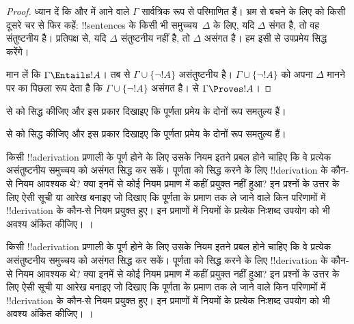 \documentclass[../../../include/open-logic-section]{subfiles}
\begin{document}
\begin{proof}
ध्यान दें कि  और  में आने
वाले $\Gamma$ सार्वत्रिक रूप से परिमाणित हैं। भ्रम से बचने के लिए
 को किसी दूसरे चर से फिर कहें: !!{sentence}s के किसी
भी समुच्चय~$\Delta$ के लिए, यदि $\Delta$ संगत है, तो वह संतुष्टनीय है।
प्रतिपक्ष से, यदि $\Delta$ संतुष्टनीय नहीं है, तो $\Delta$ असंगत है। हम इसी
से उपप्रमेय सिद्ध करेंगे।

मान लें कि $\Gamma \Entails !A$। तब  से
$\Gamma \cup \{\lnot !A\}$ असंतुष्टनीय है। $\Gamma
\cup \{\lnot !A\}$ को अपना $\Delta$ मानने पर
 का पिछला रूप देता है कि $\Gamma \cup \{\lnot !A\}$
असंगत है।
 से
$\Gamma \Proves !A$।
\end{proof}

\begin{prob}
 से
 को सिद्ध कीजिए और इस प्रकार दिखाइए
कि पूर्णता प्रमेय के दोनों रूप समतुल्य हैं।
\end{prob}
\tagendprob

\begin{prob}
 से
 को सिद्ध कीजिए और इस प्रकार दिखाइए
कि पूर्णता प्रमेय के दोनों रूप समतुल्य हैं।
\end{prob}
\tagendprob

\begin{prob}
किसी !!a{derivation} प्रणाली के पूर्ण होने के लिए उसके नियम इतने प्रबल होने
चाहिए कि वे प्रत्येक असंतुष्टनीय समुच्चय को असंगत सिद्ध कर सकें। पूर्णता को
सिद्ध करने के लिए !!{derivation} के कौन-से नियम आवश्यक थे? क्या इनमें से
कोई नियम प्रमाण में कहीं प्रयुक्त नहीं हुआ? इन प्रश्नों के उत्तर के लिए ऐसी
सूची या आरेख बनाइए जो दिखाए कि पूर्णता के प्रमाण तक ले जाने वाले किन
परिणामों में !!{derivation} के कौन-से नियम प्रयुक्त हुए। इन प्रमाणों में
नियमों के प्रत्येक निःशब्द उपयोग को भी अवश्य अंकित कीजिए।
।
\end{prob}
\tagendprob

\begin{prob}
किसी !!a{derivation} प्रणाली के पूर्ण होने के लिए उसके नियम इतने प्रबल होने
चाहिए कि वे प्रत्येक असंतुष्टनीय समुच्चय को असंगत सिद्ध कर सकें। पूर्णता को
सिद्ध करने के लिए !!{derivation} के कौन-से नियम आवश्यक थे? क्या इनमें से
कोई नियम प्रमाण में कहीं प्रयुक्त नहीं हुआ? इन प्रश्नों के उत्तर के लिए ऐसी
सूची या आरेख बनाइए जो दिखाए कि पूर्णता के प्रमाण तक ले जाने वाले किन
परिणामों में !!{derivation} के कौन-से नियम प्रयुक्त हुए। इन प्रमाणों में
नियमों के प्रत्येक निःशब्द उपयोग को भी अवश्य अंकित कीजिए।
।
\end{prob}
\tagendprob
\end{document}
